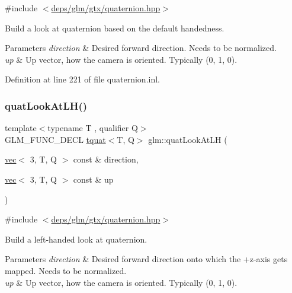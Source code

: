{\ttfamily \#include $<$\hyperlink{gtx_2quaternion_8hpp}{deps/glm/gtx/quaternion.\+hpp}$>$}

Build a look at quaternion based on the default handedness.


\begin{DoxyParams}{Parameters}
{\em direction} & Desired forward direction. Needs to be normalized. \\
\hline
{\em up} & Up vector, how the camera is oriented. Typically (0, 1, 0). \\
\hline
\end{DoxyParams}


Definition at line 221 of file quaternion.\+inl.

\mbox{\label{group__gtx__quaternion_ga6f1b3fba52fcab952d0ab523177ff443}} 
\subsubsection{\texorpdfstring{quat\+Look\+At\+L\+H()}{quatLookAtLH()}}
{\footnotesize\ttfamily template$<$typename T , qualifier Q$>$ \\
G\+L\+M\+\_\+\+F\+U\+N\+C\+\_\+\+D\+E\+CL \hyperlink{structglm_1_1tquat}{tquat}$<$T, Q$>$ glm\+::quat\+Look\+At\+LH (\begin{DoxyParamCaption}\item[{\hyperlink{structglm_1_1vec}{vec}$<$ 3, T, Q $>$ const \&}]{direction,  }\item[{\hyperlink{structglm_1_1vec}{vec}$<$ 3, T, Q $>$ const \&}]{up }\end{DoxyParamCaption})}



{\ttfamily \#include $<$\hyperlink{gtx_2quaternion_8hpp}{deps/glm/gtx/quaternion.\+hpp}$>$}

Build a left-\/handed look at quaternion.


\begin{DoxyParams}{Parameters}
{\em direction} & Desired forward direction onto which the +z-\/axis gets mapped. Needs to be normalized. \\
\hline
{\em up} & Up vector, how the camera is oriented. Typically (0, 1, 0). \\
\hline
\end{DoxyParams}


